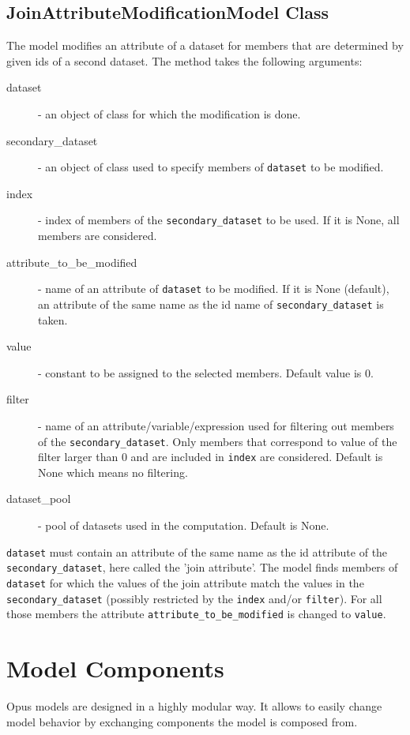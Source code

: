        
\subsection{JoinAttributeModificationModel Class}
\label{sec:api-jam-model}
%
The model modifies an attribute of a dataset for members that are determined by given ids of a second dataset.
The  method takes the following arguments:
\begin{description}
\item[dataset] - an object of class  for which the modification is done.
\item[secondary_dataset] - an object of class  used to specify members of \verb|dataset|
  to be modified.
\item[index] - index of members of the \verb|secondary_dataset| to be used. If it is None, all members are considered.
\item[attribute_to_be_modified] - name of an attribute of \verb|dataset| to be modified. If it is None (default), 
  an attribute of the same name as the id name of \verb|secondary_dataset| is taken.
\item[value] - constant to be assigned to the selected members. Default value is 0.
\item[filter] - name of an attribute/variable/expression used for filtering out members of the 
  \verb|secondary_dataset|. Only members that correspond to value of the filter larger than 0 
  and are included in \verb|index| are considered. Default is None which means no filtering. 
\item[dataset_pool] - pool of datasets used in the computation. Default is None.
\end{description}

\verb|dataset| must contain an attribute of the same name as the id attribute of the \verb|secondary_dataset|,
here called the 'join attribute'.
The model finds members of \verb|dataset| for which the values of the join attribute match the values in 
the \verb|secondary_dataset| (possibly restricted by the \verb|index| and/or \verb|filter|). For all those members
the attribute \verb|attribute_to_be_modified| is changed to \verb|value|. 


\section{Model Components}
%
\label{sec:model-components}
Opus models are designed in a highly modular way. It allows to easily change
model behavior by exchanging components the model is composed from.

